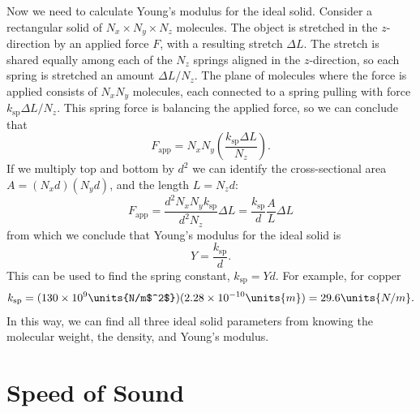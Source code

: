 Now we need to calculate Young's modulus for the ideal solid.
Consider a rectangular solid of $N_x \times N_y \times N_z$ molecules.
The object is stretched in the $z$-direction by an applied force $F$,
with a resulting stretch $\Delta L$.  The stretch is shared equally
among each of the $N_z$ springs aligned in the $z$-direction, so each
spring is stretched an amount $\Delta L/N_z$.  The plane of molecules
where the force is applied consists of $N_xN_y$ molecules, each
connected to a spring pulling with force $k_\text{sp}\Delta L/N_z$.  This
spring force is balancing the applied force, so we can conclude that
\begin{equation}
F_\text{app}= N_xN_y \left(\frac{k_\text{sp} \Delta L}{N_z}\right).
\end{equation}
If we multiply top and bottom by $d^2$ we can identify the
cross-sectional area $A=(N_x d)(N_y d)$, and the length $L=N_z d$:
\begin{equation}
F_\text{app}=\frac{d^2N_xN_y k_\text{sp}}{d^2 N_z} \Delta L 
                = \frac{k_\text{sp}}{d}
\frac{A}{L}\Delta L
\end{equation}
from which we conclude that Young's modulus for the ideal solid
is
\begin{equation}
Y=\frac{k_\text{sp}}{d}.
\end{equation}
This can be used to find the spring constant, $k_\text{sp} = Yd$.  For
example, for copper
\begin{equation}
k_\text{sp} = (130\times 10^9\units{N/m$^2$})(2.28\times 10^{-10}\units{m})
 = 29.6\units{N/m}.
\end{equation}
In this way, we can find all three ideal solid parameters from
knowing the molecular weight, the density, and Young's modulus.


\section{Speed of Sound}
\label{section:speedofsound}

